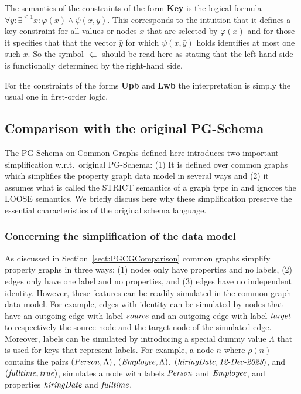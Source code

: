 The semantics of the constraints of the form \textbf{Key} is the logical formula $\forall \bar{y} : \exists^{\leq 1} x : \varphi(x) \land \psi(x, \bar{y})$. This corresponds to the intuition that it defines a key constraint for all values or nodes $x$ that are selected by $\varphi(x)$ and for those it specifies that that the vector $\bar{y}$ for which $\psi(x, \bar{y})$ holds identifies at most one such $x$.
So the symbol $\Lleftarrow$ should be read here as stating that the left-hand side is functionally determined by the right-hand side.

For the constraints of the forms \textbf{Upb} and \textbf{Lwb} the interpretation is simply the usual one in first-order logic.

\subsection{Comparison with the original PG-Schema }


The PG-Schema on Common Graphs defined here introduces two important simplification w.r.t.\ original PG-Schema: (1) It is defined over common graphs which simplifies the property graph data model in several ways and (2) it assumes what is called the STRICT semantics of a graph type in  \cite{ABDF23} and ignores the LOOSE semantics. We briefly discuss here why these simplification preserve the essential characteristics of the original schema language.

\subsubsection{Concerning the simplification of the data model}

As discussed in Section~\ref{sect:PGCGComparison} common graphs simplify property graphs in three ways: (1) nodes only have properties and no labels, (2) edges only have one label and no properties, and (3) edges have no independent identity. 
However, these features can be readily simulated in the common graph data model.
For example, edges with identity can be simulated by nodes that have an outgoing edge with label $\mathit{source}$ and an outgoing edge with label $\mathit{target}$ to respectively the source node and the target node of the simulated edge.
Moreover, labels can be simulated by introducing a special dummy value $\Lambda$ that is used for keys that represent labels. 
For example, a node $n$ where $\rho(n)$ contains the pairs $(\mathit{Person}, \Lambda)$, $(\mathit{Employee}, \Lambda)$, $(\mathit{hiringDate}, \textit{12-Dec-2023})$, and $(\mathit{fulltime}, \mathit{true})$, simulates a node with labels $\mathit{Person}$ and $\mathit{Employee}$, and properties $\mathit{hiringDate}$ and $\mathit{fulltime}$. 

